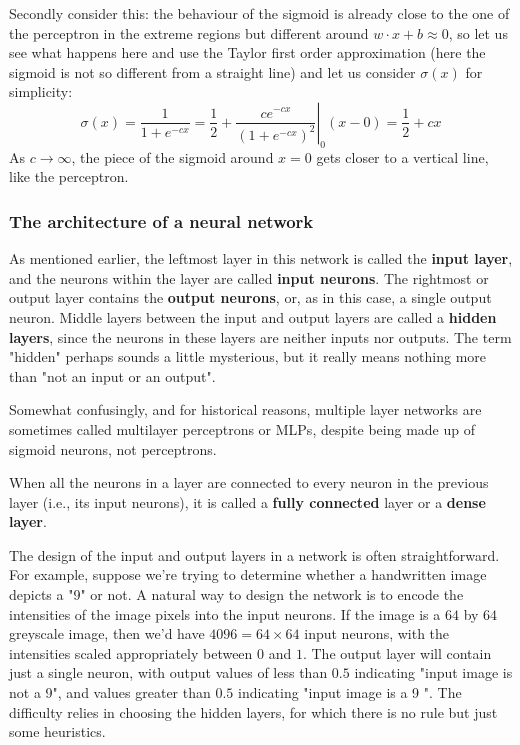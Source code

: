 \documentclass[12pt, letterpaper]{article}
\theoremstyle{definition}
\let\tb\textbf
\begin{document}
Secondly consider this: the behaviour of the sigmoid is already close to the one of the perceptron in the extreme regions but different around $w\cdot x +b \approx 0$, so let us see what happens here and use the Taylor first order approximation (here the sigmoid is not so different from a straight line) and let us consider $\sigma(x)$ for simplicity:
\begin{equation}
\sigma(x) = \frac{1}{1+e^{-cx}} = \frac{1}{2} +  \left. \frac{ce^{-cx}}{\left(1+e^{-cx}\right)^2}\right|_0 (x-0) = \frac{1}{2}+ cx
\end{equation}
As $c\rightarrow \infty$, the piece of the sigmoid around $x=0$ gets closer to a vertical line, like the perceptron.

\subsubsection{The architecture of a neural network}
As mentioned earlier, the leftmost layer in this network is called the \tb{input layer}, and the neurons within the layer are called \tb{input neurons}. The rightmost or output layer contains the \tb{output neurons}, or, as in this case, a single output neuron. Middle layers between the input and output layers are called a \tb{hidden layers}, since the neurons in these layers are neither inputs nor outputs. The term "hidden" perhaps sounds a little mysterious, but it really means nothing more than "not an input or an output". 

Somewhat confusingly, and for historical reasons, multiple layer networks are sometimes called multilayer perceptrons or MLPs, despite being made up of sigmoid neurons, not perceptrons. 

When all the neurons in a layer are connected to every neuron in the previous layer (i.e., its input neurons), it is called a \tb{fully connected} layer or a \tb{dense layer}.

The design of the input and output layers in a network is often straightforward. For example, suppose we're trying to determine whether a handwritten image depicts a "9" or not. A natural way to design the network is to encode the intensities of the image pixels into the input neurons. If the image is a $64$ by $64$ greyscale image, then we'd have $4096=64\times64$ input neurons, with the intensities scaled appropriately between $0$ and $1$. The output layer will contain just a single neuron, with output values of less than $0.5$ indicating "input image is not a 9", and values greater than $0.5$ indicating "input image is a 9 ". The difficulty relies in choosing the hidden layers, for which there is no rule but just some heuristics. 
\end{document}

